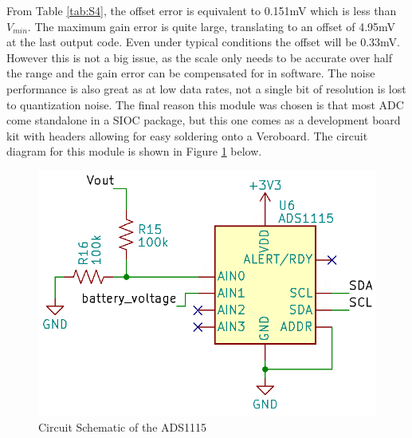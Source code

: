 \documentclass[class=report,11pt,crop=false]{standalone}
\begin{document}
	From Table \ref{tab:S4}, the offset error is equivalent to 0.151mV which is less than $V_{min}$. The maximum gain error is quite large, translating to an offset of 4.95mV at the last output code. Even under typical conditions the offset will be 0.33mV. However this is not a big issue, as the scale only needs to be accurate over half the range and the gain error can be compensated for in software. The noise performance is also great as at low data rates, not a single bit of resolution is lost to quantization noise. The final reason this module was chosen is that most ADC come standalone in a SIOC package, but this one comes as a development board kit with headers allowing for easy soldering onto a Veroboard. The circuit diagram for this module is shown in Figure \ref{fig:S6} below.
	\begin{figure}[h!]
		\centering
		\includegraphics[width=0.5\linewidth]{Figures/ADC.png}
		\caption{Circuit Schematic of the ADS1115}
		\label{fig:S6}
	\end{figure}
	
	
	\ifstandalone
	
	\printnoidxglossary[type=\acronymtype,nonumberlist]
	\fi
\end{document}
